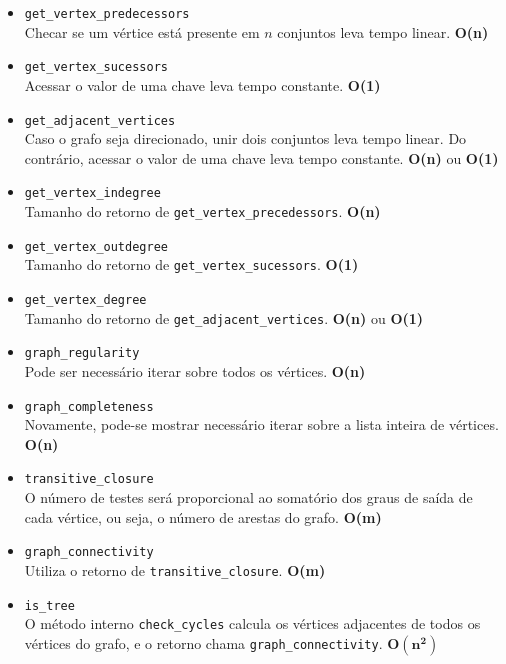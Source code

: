 \documentclass{article}
\begin{document}
\begin{itemize}
    \item \texttt{get\_vertex\_predecessors} \\
    Checar se um vértice está presente em $n$ conjuntos leva tempo linear.
    \textbf{O(n)}

    \item \texttt{get\_vertex\_sucessors} \\
    Acessar o valor de uma chave leva tempo constante. \textbf{O(1)}

    \item \texttt{get\_adjacent\_vertices} \\
    Caso o grafo seja direcionado, unir dois conjuntos leva tempo linear. Do
    contrário, acessar o valor de uma chave leva tempo constante. \textbf{O(n)}
    ou \textbf{O(1)}

    \item \texttt{get\_vertex\_indegree} \\
    Tamanho do retorno de \texttt{get\_vertex\_precedessors}. \textbf{O(n)}

    \item \texttt{get\_vertex\_outdegree} \\
    Tamanho do retorno de \texttt{get\_vertex\_sucessors}. \textbf{O(1)}

    \item \texttt{get\_vertex\_degree} \\
    Tamanho do retorno de \texttt{get\_adjacent\_vertices}. \textbf{O(n)} ou
    \textbf{O(1)}

    \item \texttt{graph\_regularity} \\
    Pode ser necessário iterar sobre todos os vértices. \textbf{O(n)}

    \item \texttt{graph\_completeness} \\
    Novamente, pode-se mostrar necessário iterar sobre a lista inteira de
    vértices. \textbf{O(n)}

    \item \texttt{transitive\_closure} \\
    O número de testes será proporcional ao somatório dos graus de saída
    de cada vértice, ou seja, o número de arestas do grafo. \textbf{O(m)}

    \item \texttt{graph\_connectivity} \\
    Utiliza o retorno de \texttt{transitive\_closure}. \textbf{O(m)}

    \item \texttt{is\_tree} \\
    O método interno \texttt{check\_cycles} calcula os vértices adjacentes de
    todos os vértices do grafo, e o retorno chama \texttt{graph\_connectivity}.
    $\mathbf{O(n^2)}$
\end{itemize}
\end{document}
